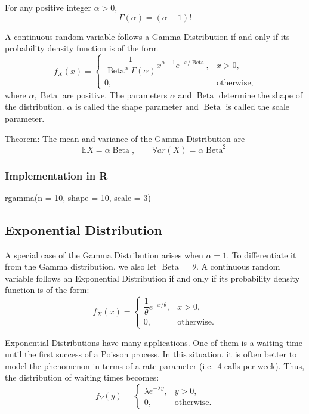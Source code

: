 \documentclass[
  letterpaper,
  DIV=11,
  numbers=noendperiod]{scrreprt}
\newenvironment{Shaded}{\begin{snugshade}}{\end{snugshade}}
\newcommand{\AttributeTok}[1]{\textcolor[rgb]{0.40,0.45,0.13}{#1}}
\newcommand{\DecValTok}[1]{\textcolor[rgb]{0.68,0.00,0.00}{#1}}
\newcommand{\FunctionTok}[1]{\textcolor[rgb]{0.28,0.35,0.67}{#1}}
\newcommand{\NormalTok}[1]{\textcolor[rgb]{0.00,0.23,0.31}{#1}}
\begin{document}
For any positive integer \(\alpha > 0\),
\[\Gamma(\alpha) = (\alpha - 1)!\]

A continuous random variable follows a Gamma Distribution if and only if
its probability density function is of the form \[f_X(x) =
\begin{cases}
\dfrac{1}{\operatorname{Beta}^{\alpha}\Gamma(\alpha)} x^{\alpha - 1} e^{-x/\operatorname{Beta}}, & x > 0, \\[2ex]
0, & \text{otherwise},
\end{cases}\] where \(\alpha, \operatorname{Beta}\) are positive. The
parameters \(\alpha\) and \(\operatorname{Beta}\) determine the shape of
the distribution. \(\alpha\) is called the shape parameter and
\(\operatorname{Beta}\) is called the scale parameter.

Theorem: The mean and variance of the Gamma Distribution are
\[\mathbb EX = \alpha \operatorname{Beta},
\qquad
\mathbb{V}ar(X) = \alpha \operatorname{Beta}^2\]

\subsubsection{Implementation in R}\label{implementation-in-r-5}

\begin{Shaded}
\begin{Highlighting}[]
\FunctionTok{rgamma}\NormalTok{(}\AttributeTok{n =} \DecValTok{10}\NormalTok{, }\AttributeTok{shape =} \DecValTok{10}\NormalTok{, }\AttributeTok{scale =} \DecValTok{3}\NormalTok{)}
\end{Highlighting}
\end{Shaded}

\subsection{Exponential Distribution}\label{exponential-distribution}

A special case of the Gamma Distribution arises when \(\alpha = 1\). To
differentiate it from the Gamma distribution, we also let
\(\operatorname{Beta}= \theta\). A continuous random variable follows an
Exponential Distribution if and only if its probability density function
is of the form: \[f_X(x) =
\begin{cases}
\dfrac{1}{\theta} e^{-x/\theta}, & x > 0, \\[2ex]
0, & \text{otherwise}.
\end{cases}\]

Exponential Distributions have many applications. One of them is a
waiting time until the first success of a Poisson process. In this
situation, it is often better to model the phenomenon in terms of a rate
parameter (i.e.~4 calls per week). Thus, the distribution of waiting
times becomes: \[
f_Y(y) =
\begin{cases}
\lambda e^{-\lambda y}, & y > 0, \\[2ex]
0, & \text{otherwise}.
\end{cases}\]
\end{document}
